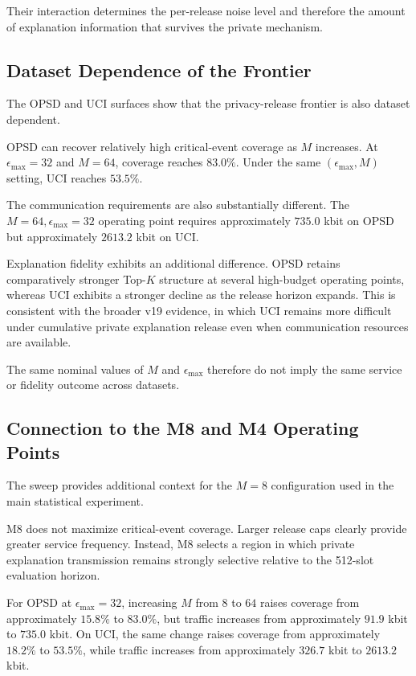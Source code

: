 \documentclass[11pt]{article}
\begin{document}
Their interaction determines the per-release noise level and therefore the amount of explanation information that survives the private mechanism.

\subsection{Dataset Dependence of the Frontier}

The OPSD and UCI surfaces show that the privacy-release frontier is also dataset dependent.

OPSD can recover relatively high critical-event coverage as \(M\) increases. At \(\epsilon_{\max}=32\) and \(M=64\), coverage reaches \(83.0\%\). Under the same \((\epsilon_{\max},M)\) setting, UCI reaches \(53.5\%\).

The communication requirements are also substantially different. The \(M=64,\epsilon_{\max}=32\) operating point requires approximately \(735.0\) kbit on OPSD but approximately \(2613.2\) kbit on UCI.

Explanation fidelity exhibits an additional difference. OPSD retains comparatively stronger Top-\(K\) structure at several high-budget operating points, whereas UCI exhibits a stronger decline as the release horizon expands. This is consistent with the broader v19 evidence, in which UCI remains more difficult under cumulative private explanation release even when communication resources are available.

The same nominal values of \(M\) and \(\epsilon_{\max}\) therefore do not imply the same service or fidelity outcome across datasets.

\subsection{Connection to the M8 and M4 Operating Points}

The sweep provides additional context for the \(M=8\) configuration used in the main statistical experiment.

M8 does not maximize critical-event coverage. Larger release caps clearly provide greater service frequency. Instead, M8 selects a region in which private explanation transmission remains strongly selective relative to the 512-slot evaluation horizon.

For OPSD at \(\epsilon_{\max}=32\), increasing \(M\) from \(8\) to \(64\) raises coverage from approximately \(15.8\%\) to \(83.0\%\), but traffic increases from approximately \(91.9\) kbit to \(735.0\) kbit. On UCI, the same change raises coverage from approximately \(18.2\%\) to \(53.5\%\), while traffic increases from approximately \(326.7\) kbit to \(2613.2\) kbit.
\end{document}
